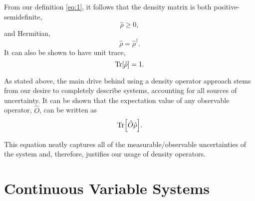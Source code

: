 \documentclass[11pt,a4paper]{article}
\numberwithin{equation}{section}
\begin{document}
	From our definition \ref{eq:1}, it follows that the density matrix is both positive-semidefinite, 
	\begin{equation} \label{eq:2}
	\hat{\rho} \geq 0,
	\end{equation}
	and Hermitian,
	\begin{equation} \label{eq:3}
	\hat{\rho} = \hat{\rho}^\dagger .
	\end{equation}
	It can also be shown to have unit trace, 
	\begin{equation} \label{eq:4}
	\Tr[\hat{\rho}] = 1.
	\end{equation}
	
	As stated above, the main drive behind using a density operator approach stems from our desire to completely describe systems, accounting for all sources of uncertainty. It can be shown that the expectation value of any observable operator, $\hat{O}$, can be written as
	\begin{equation} \label{eq:5}
	\Tr[\hat{O}\hat{\rho}].
	\end{equation}
	
	This equation neatly captures all of the measurable/observable uncertainties of the system and, therefore, justifies our usage of density operators.
	
	\iffalse
	
	\subsection{Discrete Variable Systems}

	Our focus in this report is on CV systems. Before discussing those, however, it is worth briefly noting that discrete variable systems exist and arise frequently in quantum mechanics. As the name suggests, discrete variable systems are ones in which the possible outcomes of a measurement are discrete (or quantised). This manifests itself mathematically via operators whose eigenvalues are discrete. If, in addition to being discrete, the eigenvalues form a finite set, the system can be handled using matrix vector methods. There are numerous examples of discrete variable systems such as the energy levels of a quantum harmonic oscillator (infinite dimensional Hilbert space) or the spin of an electron (two dimensional Hilbert space).
	
	\fi
	
	\section{Continuous Variable Systems}
	\label{sec:cvs}
	
\end{document}
